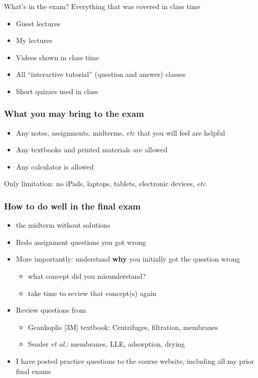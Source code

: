 \begin{frame}\frametitle{}
	\begin{exampleblock}{What's in the exam?}
		Everything that was covered in class time
	\end{exampleblock}
	\vspace{24pt}
	\begin{itemize}
		\item	Guest lectures
		\item	My lectures
		\item	Videos shown in class time
		\item	All ``interactive tutorial'' (question and answer) classes 
		\item	Short quizzes used in class
	\end{itemize}	
\end{frame}

\begin{frame}\frametitle{What you may bring to the exam}
	\begin{itemize}
		\item	Any notes, assignments, midterms, \emph{etc} that you will feel are helpful
		\item	Any textbooks and printed materials are allowed
		\item	Any calculator is allowed
	\end{itemize}
	
	\vspace{12pt}
	Only limitation: no iPads, laptops, tablets, electronic devices, \emph{etc}
\end{frame}

\begin{frame}\frametitle{How to do well in the final exam}
	\begin{itemize}
		\item	{\color{myRed}{Repeat}} the midterm without solutions
		\item	Redo assignment questions you got wrong
		\item	More importantly: understand \textbf{why} you initially got the question wrong
			\begin{itemize}
				\item	what concept did you misunderstand?
				\item	take time to review that concept(s) again
			\end{itemize}
		\item	Review questions from 
		\begin{itemize}
			\item	Geankoplis [3M] textbook: Centrifuges, filtration, membranes
			\item	 Seader \emph{et al.}: membranes, LLE, adsorption, drying
		\end{itemize}
		
		\vspace{12pt}
		
		\item	{\color{myOrange}I have posted practice questions to the course website,} including all my prior final exams
	\end{itemize}
\end{frame}

